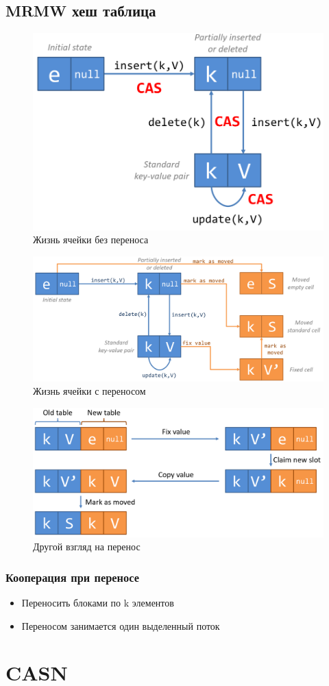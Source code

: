 \documentclass[10pt,a4paper,oneside,titlepage]{article}
\theoremstyle{plain}
\theoremstyle{defenition}
\begin{document}
\subsection{MRMW хеш таблица}

\begin{figure}[h!]
	\centering
	\includegraphics[width=0.4\linewidth]{pictures/Element2}
	\caption{Жизнь ячейки без переноса}
	\label{fig:element2}
\end{figure}

\begin{figure}[h!]
	\centering
	\includegraphics[width=0.4\linewidth]{pictures/Element3}
	\caption{Жизнь ячейки с переносом}
	\label{fig:element3}
\end{figure}

\begin{figure}
	\centering
	\includegraphics[width=0.4\linewidth]{pictures/Element4}
	\caption{Другой взгляд на перенос}
	\label{fig:element4}
\end{figure}

\subsubsection{Кооперация при переносе}

\begin{itemize}
	\item Переносить блоками по k элементов
	\item Переносом занимается один выделенный поток
\end{itemize}

\section{CASN}
\end{document}

